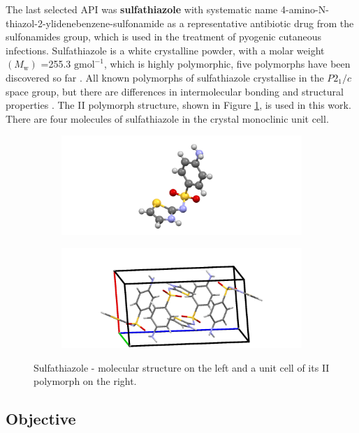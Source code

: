 The last selected API was \textbf{sulfathiazole} with systematic name 4-amino-N-thiazol-2-ylidenebenzene-sulfonamide as a representative antibiotic drug from the sulfonamides group, which is used in the treatment of pyogenic cutaneous infections. Sulfathiazole is a white crystalline powder, with a molar weight $(M_\mathrm{w})$ =255.3 $\mathrm{gmol^{-1}}$, which is highly polymorphic, five polymorphs have been discovered so far \cite{caron_comparison_2011}. All known polymorphs of sulfathiazole crystallise in the $P2_1/c$ space group, but there are differences in intermolecular bonding and structural properties \cite{drebushchak_crystal_2008}. The II polymorph structure, shown in Figure \ref{fig:sulfathiazole}, is used in this work. There are four molecules of sulfathiazole in the crystal monoclinic unit cell. 

\begin{figure}[htb!]
	\begin{subfigure}{0.5\textwidth}
		\includegraphics[width=1.2\linewidth]{img/sulfathiazol.png} 
	\end{subfigure}
	\begin{subfigure}{0.5\textwidth}
		\includegraphics[width=1.1\linewidth]{img/sulfathiazol_packing.png}
	\end{subfigure}
	\caption{Sulfathiazole - molecular structure on the left and a unit cell of its II polymorph on the right.}
	\label{fig:sulfathiazole}
\end{figure}

\subsection{Objective}

